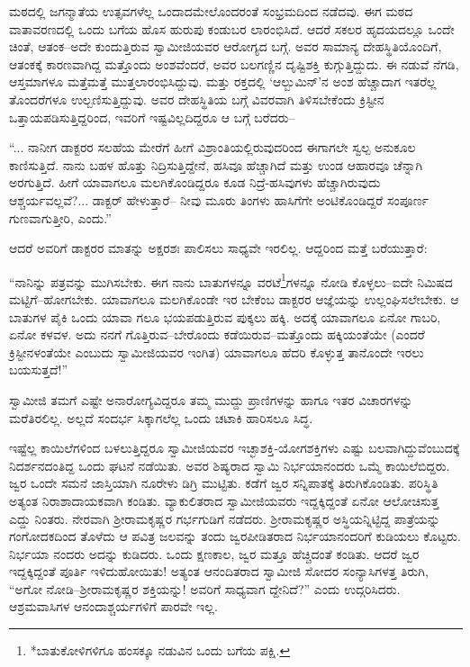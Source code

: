 ಮಠದಲ್ಲಿ ಜಗನ್ಮಾತೆಯ ಉತ್ಸವಗಳೆಲ್ಲ ಒಂದಾದಮೇಲೊಂದರಂತೆ ಸಂಭ್ರಮದಿಂದ ನಡೆದವು. ಈಗ ಮಠದ ವಾತಾವರಣದಲ್ಲಿ ಒಂದು ಬಗೆಯ ಹೊಸ ಹುರುಪು ಕಂಡುಬರ ಲಾರಂಭಿಸಿದೆ. ಆದರೆ ಸಕಲರ ಹೃದಯದಲ್ಲೂ ಒಂದೇ ಚಿಂತೆ, ಆತಂಕ–ಅದೇ ಕುಂದುತ್ತಿರುವ ಸ್ವಾಮೀಜಿಯವರ ಆರೋಗ್ಯದ ಬಗ್ಗೆ. ಅವರ ಸಾಮಾನ್ಯ ದೇಹಸ್ಥಿತಿಯೊಂದಿಗೆ, ಆತಂಕಕ್ಕೆ ಕಾರಣವಾಗಿದ್ದ ಮತ್ತೊಂದು ಅಂಶವೆಂದರೆ, ಅವರ ಬಲಗಣ್ಣಿನ ದೃಷ್ಟಿಶಕ್ತಿ ಕುಗ್ಗುತ್ತಿದ್ದುದು. ಈ ನಡುವೆ ನೆಗಡಿ, ಆಸ್ತಮಾಗಳೂ ಮತ್ತೆಮತ್ತೆ ಮುತ್ತಲಾರಂಭಿಸಿದ್ದುವು. ಮತ್ತು ರಕ್ತದಲ್ಲಿ ‘ಆಲ್ಬುಮಿನ್​’ನ ಅಂಶ ಹೆಚ್ಚಾದಾಗ ಇತರೆಲ್ಲ ತೊಂದರೆಗಳೂ ಉಲ್ಬಣಿಸುತ್ತಿದ್ದುವು. ಅವರ ದೇಹಸ್ಥಿತಿಯ ಬಗ್ಗೆ ವಿವರವಾಗಿ ತಿಳಿಸಬೇಕೆಂದು ಕ್ರಿಸ್ಟೀನ ಒತ್ತಾಯಪಡಿಸುತ್ತಿದ್ದರಿಂದ, ಇವರಿಗೆ ಇಷ್ಟವಿಲ್ಲದಿದ್ದರೂ ಆ ಬಗ್ಗೆ ಬರೆದರು–

“... ನಾನೀಗ ಡಾಕ್ಟರರ ಸಲಹೆಯ ಮೇರೆಗೆ ಹೀಗೆ ವಿಶ್ರಾಂತಿಯಲ್ಲಿರುವುದರಿಂದ ಈಗಾಗಲೇ ಸ್ವಲ್ಪ ಅನುಕೂಲ ಕಾಣಿಸುತ್ತಿದೆ. ನಾನು ಬಹಳ ಹೊತ್ತು ನಿದ್ರಿಸುತ್ತಿದ್ದೇನೆ, ಹಸಿವೂ ಹೆಚ್ಚಾಗಿದೆ ಮತ್ತು ಉಂಡ ಆಹಾರವೂ ಚೆನ್ನಾಗಿ ಅರಗುತ್ತಿದೆ. ಹೀಗೆ ಯಾವಾಗಲೂ ಮಲಗಿಕೊಂಡಿದ್ದರೂ ಕೂಡ ನಿದ್ರೆ-ಹಸಿವುಗಳು ಹೆಚ್ಚಾಗಿರುವುದು ಆಶ್ಚರ್ಯವಲ್ಲವೆ?... ಡಾಕ್ಟರ್ ಹೇಳುತ್ತಾರೆ– ನೀವು ಮೂರು ತಿಂಗಳು ಹಾಸಿಗೆಗೇ ಅಂಟಿಕೊಂಡಿದ್ದರೆ ಸಂಪೂರ್ಣ ಗುಣವಾಗುತ್ತೀರಿ, ಎಂದು.”

ಆದರೆ ಅವರಿಗೆ ಡಾಕ್ಟರರ ಮಾತನ್ನು ಅಕ್ಷರಶಃ ಪಾಲಿಸಲು ಸಾಧ್ಯವೇ ಇರಲಿಲ್ಲ. ಆದ್ದರಿಂದ ಮತ್ತೆ ಬರೆಯುತ್ತಾರೆ:

“ನಾನಿನ್ನು ಪತ್ರವನ್ನು ಮುಗಿಸಬೇಕು. ಈಗ ನಾನು ಬಾತುಗಳನ್ನೂ ವರಟೆ\footnote{*ಬಾತುಕೋಳಿಗಳಿಗೂ ಹಂಸಕ್ಕೂ ನಡುವಿನ ಒಂದು ಬಗೆಯ ಪಕ್ಷಿ.}ಗಳನ್ನೂ ನೋಡಿ ಕೊಳ್ಳಲು–ಐದೇ ನಿಮಿಷದ ಮಟ್ಟಿಗೆ–ಹೋಗಬೇಕು. ಯಾವಾಗಲೂ ಮಲಗಿಕೊಂಡೇ ಇರ ಬೇಕೆಂಬ ಡಾಕ್ಟರರ ಆಜ್ಞೆಯನ್ನು ಉಲ್ಲಂಘಿಸಲೇಬೇಕು. ಆ ಬಾತುಗಳ ಪೈಕಿ ಒಂದು ಯಾವಾ ಗಲೂ ಭಯಪಡುತ್ತಿರುವ ಪುಕ್ಕಲು ಹಕ್ಕಿ. ಅದಕ್ಕೆ ಯಾವಾಗಲೂ ಏನೋ ಗಾಬರಿ, ಏನೋ ಕಳವಳ. ಅದು ನನಗೆ ಗೊತ್ತಿರುವ–ಬೇರೊಂದು ಕಡೆಯಿರುವ–ಮತ್ತೊಂದು ಹಕ್ಕಿಯಂತೆಯೇ (ಎಂದರೆ ಕ್ರಿಸ್ಟೀನಳಂತೆಯೇ ಎಂಬುದು ಸ್ವಾಮೀಜಿಯವರ ಇಂಗಿತ) ಯಾವಾಗಲೂ ಹೆದರಿ ಕೊಳ್ಳುತ್ತ ತಾನೊಂದೇ ಇರಲು ಬಯಸುತ್ತದೆ!”

ಸ್ವಾಮೀಜಿ ತಮಗೆ ಎಷ್ಟೇ ಅನಾರೋಗ್ಯವಿದ್ದರೂ ತಮ್ಮ ಮುದ್ದು ಪ್ರಾಣಿಗಳನ್ನು ಹಾಗೂ ಇತರ ವಿಚಾರಗಳನ್ನು ಮರೆತಿರಲಿಲ್ಲ. ಅಲ್ಲದೆ ಸಂದರ್ಭ ಸಿಕ್ಕಾಗಲೆಲ್ಲ ಒಂದು ಚಟಾಕಿ ಹಾರಿಸಲೂ ಸಿದ್ಧ.

ಇಷ್ಟೆಲ್ಲ ಕಾಯಿಲೆಗಳಿಂದ ಬಳಲುತ್ತಿದ್ದರೂ ಸ್ವಾಮೀಜಿಯವರ ಇಚ್ಛಾಶಕ್ತಿ-ಯೋಗಶಕ್ತಿಗಳು ಎಷ್ಟು ಬಲವಾಗಿದ್ದುವೆಂಬುದಕ್ಕೆ ನಿದರ್ಶನದಂತಿದ್ದ ಒಂದು ಘಟನೆ ನಡೆಯಿತು. ಅವರ ಶಿಷ್ಯರಾದ ಸ್ವಾಮಿ ನಿರ್ಭಯಾನಂದರು ಒಮ್ಮೆ ಕಾಯಿಲೆಬಿದ್ದರು. ಜ್ವರ ಒಂದೇ ಸಮನೆ ಜಾಸ್ತಿಯಾಗಿ ನೂರೇಳು ಡಿಗ್ರಿ ಮುಟ್ಟಿತು. ಕಡೆಗೆ ಜ್ವರ ಸನ್ನಿಪಾತಕ್ಕೆ ತಿರುಗಿಕೊಂಡಿತು. ಪರಿಸ್ಥಿತಿ ಅತ್ಯಂತ ನಿರಾಶಾದಾಯಕವಾಗಿ ಕಂಡಿತು. ವ್ಯಾಕುಲಿತರಾದ ಸ್ವಾಮೀಜಿಯವರು ಇದ್ದಕ್ಕಿದ್ದಂತೆ ಏನೋ ಆಲೋಚಿಸುತ್ತ ಎದ್ದು ನಿಂತರು. ನೇರವಾಗಿ ಶ್ರೀರಾಮಕೃಷ್ಣರ ಗರ್ಭಗುಡಿಗೆ ನಡೆದರು. ಶ್ರೀರಾಮಕೃಷ್ಣರ ಅಸ್ಥಿಯನ್ನಿಟ್ಟಿದ್ದ ಪಾತ್ರೆಯನ್ನು ಗಂಗೋದಕದಿಂದ ತೊಳೆದು ಆ ಪವಿತ್ರ ಜಲವನ್ನು ತಂದು ಜ್ವರಪೀಡಿತರಾದ ನಿರ್ಭಯಾನಂದರಿಗೆ ಕುಡಿಯಲು ಕೊಟ್ಟರು. ನಿರ್ಭಯಾ ನಂದರು ಅದನ್ನು ಕುಡಿದರು. ಒಂದು ಕ್ಷಣಕಾಲ, ಜ್ವರ ಮತ್ತೂ ಹೆಚ್ಚಿದಂತೆ ಕಂಡಿತು. ಆದರೆ ಜ್ವರ ಇದ್ದಕ್ಕಿದ್ದಂತೆ ಪೂರ್ತಿ ಇಳಿದುಹೋಯಿತು! ಅತ್ಯಂತ ಆನಂದಿತರಾದ ಸ್ವಾಮೀಜಿ ಸೋದರ ಸಂನ್ಯಾಸಿಗಳತ್ತ ತಿರುಗಿ, “ಅಗೋ ನೋಡಿ–ಶ್ರೀರಾಮಕೃಷ್ಣರ ಶಕ್ತಿಯನ್ನು! ಅವರಿಗೆ ಸಾಧ್ಯವಾಗ ದ್ದೇನಿದೆ?” ಎಂದು ಉದ್ಗರಿಸಿದರು. ಆಶ್ರಮವಾಸಿಗಳ ಆನಂದಾಶ್ಚರ್ಯಗಳಿಗೆ ಪಾರವೇ ಇಲ್ಲ.

